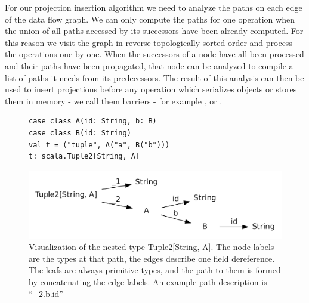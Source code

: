 For our projection insertion algorithm we need to analyze the paths on each edge of the data flow graph. We can only compute the paths for one operation when the union of all paths accessed by its successors have been already computed. For this reason we visit the graph in reverse topologically sorted order and process the operations one by one. When the successors of a node have all been processed and their paths have been propagated, that node can be analyzed to compile a list of paths it needs from its predecessors. The result of this analysis can then be used to insert projections before any operation which serializes objects or stores them in memory - we call them barriers - for example ,  or .

\begin{figure}
\begin{lstlisting}[name=code, caption=Nested type for paths example., captionpos=b, label=lst:types]
case class A(id: String, b: B)
case class B(id: String)  
val t = ("tuple", A("a", B("b"))) 
t: scala.Tuple2[String, A]
\end{lstlisting}
\centering
\includegraphics[clip=true, width=0.95\columnwidth]{dot/access.png}
\caption{Visualization of the nested type Tuple2[String, A]. The node labels are the types at that path, the edges describe one field dereference. The leafs are always primitive types, and the path to them is formed by concatenating the edge labels. An example path description is ``\_2.b.id''}
\label{fig:type_tree}
\end{figure}


